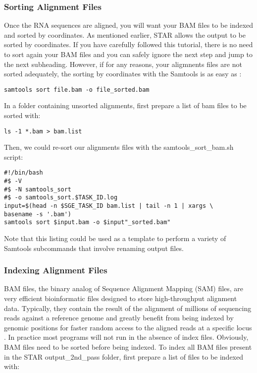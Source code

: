 \subsubsection{Sorting Alignment Files}


Once the RNA sequences are aligned, you will want your BAM files to be indexed and sorted by coordinates. As mentioned earlier, STAR allows the output to be sorted by coordinates. If you have carefully followed this tutorial, there is no need to sort again your BAM files and you can safely ignore the next step and jump to the next subheading. However, if for any reasons, your aligmnents files are not sorted adequately, the sorting by coordinates with the Samtools is as easy as :

\begin{verbatim}
samtools sort file.bam -o file_sorted.bam
\end{verbatim}

In a folder containing unsorted alignments, first prepare a list of bam files to be sorted with:

\begin{verbatim}
ls -1 *.bam > bam.list
\end{verbatim}

Then, we could re-sort our alignments files with the \noindent samtools\_sort\_bam.sh script:

\begin{verbatim}
#!/bin/bash
#$ -V
#$ -N samtools_sort
#$ -o samtools_sort.$TASK_ID.log
input=$(head -n $SGE_TASK_ID bam.list | tail -n 1 | xargs \
basename -s '.bam')
samtools sort $input.bam -o $input"_sorted.bam"
\end{verbatim}

Note that this listing could be used as a template to perform a variety of Samtools subcommands that involve renaming output files.

\subsubsection{Indexing Alignment Files}

BAM files, the binary analog of Sequence Alignment Mapping (SAM) files,  are very efficient bioinformatic files designed to store high-throughput alignment data. Typically, they contain the result of the alignment of millions of sequencing reads against a reference genome and greatly benefit from being indexed by genomic positions for faster random access to the aligned reads at a specific locus \cite{DataSkills}. In practice most programs will not run in the absence of index files. Obviously, BAM files need to be sorted before being indexed. To index all BAM files present in the STAR output\_2nd\_pass folder, first prepare a list of files to be indexed with:

